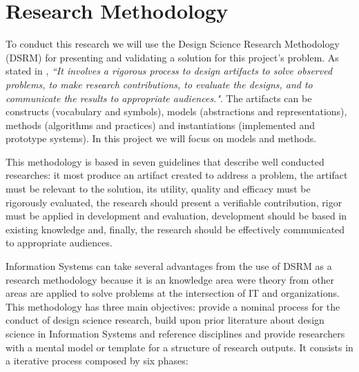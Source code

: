 
% 
% 

\section{Research Methodology}

To conduct this research we will use the Design Science Research Methodology (DSRM) \cite{DSRM} for presenting and validating a solution for this project's problem. As stated in \cite{DSRM}, \textit{``It involves a rigorous process to design artifacts to solve observed problems, to make research contributions, to evaluate the designs, and to communicate the results to appropriate audiences."}. The artifacts can be constructs (vocabulary and symbols), models (abstractions and representations), methods (algorithms and practices) and instantiations (implemented and prototype systems). In this project we will focus on models and methods.\par
This methodology is based in seven guidelines that describe well conducted researches: it most produce an artifact created to address a problem, the artifact must be relevant to the solution, its utility, quality and efficacy must be rigorously evaluated, the research should present a verifiable contribution, rigor must be applied in development and evaluation, development should be based in existing knowledge and, finally, the research should be effectively communicated to appropriate audiences.\par
Information Systems can take several advantages from the use of DSRM as a research methodology because it is an knowledge area were theory from other areas are applied to solve problems at the intersection of IT and organizations.\cite{DSRM}
This methodology has three main objectives: provide a nominal process for the conduct of design science research, build upon prior literature about design science in Information Systems and reference disciplines and provide researchers with a mental model or template for a structure of research outputs. It consists in a iterative process composed by six phases:

